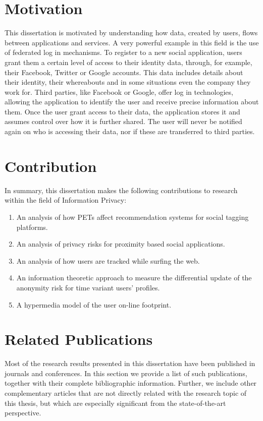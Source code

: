 \section{Motivation}

This dissertation is motivated by understanding how data, created by users, flows between applications and services. A very powerful example in this field is the use of federated log in mechanisms. To register to a new social application, users grant them a certain level of access to their identity data, through, for example, their Facebook, Twitter or Google accounts. This data includes details about their identity, their whereabouts and in some situations even the company they work for. Third parties, like Facebook or Google, offer log in technologies, allowing the application to identify the user and receive precise information about them. Once the user grant access to their data, the application stores it and assumes control over how it is further shared. The user will never be notified again on who is accessing their data, nor if these are transferred to third parties. 

\section{Contribution}

In summary, this dissertation makes the following contributions to research within the field of Information Privacy:

\begin{enumerate}
    \item An analysis of how PETs affect recommendation systems for social tagging platforms.
    \item An analysis of privacy risks for proximity based social applications.
    \item An analysis of how users are tracked while surfing the web.
    \item An information theoretic approach to measure the differential update of the anonymity risk for time variant users’ profiles.
    \item A hypermedia model of the user on-line footprint.
\end{enumerate}

\section{Related Publications}

Most of the research results presented in this dissertation have been published in journals and conferences. In this section we provide a list of such publications, together with their complete bibliographic information. Further, we include other complementary articles that are not directly related with the research topic of this thesis, but which are especially
significant from the state-of-the-art perspective.

